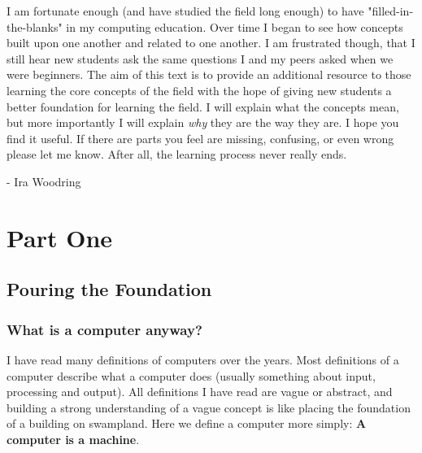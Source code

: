 \documentclass[11pt,fleqn]{book} %
\begin{document}
I am fortunate enough (and have studied the field long enough) to have "filled-in-the-blanks" in my computing education.  Over time I began to see how concepts built upon one another and related to one another.  I am frustrated though, that I still hear new students ask the same questions I and my peers asked when we were beginners.  The aim of this text is to provide an additional resource to those learning the core concepts of the field with the hope of giving new students a better foundation for learning the field.  I will explain what the concepts mean, but more importantly I will explain \textit{why} they are the way they are.  I hope you find it useful.  If there are parts you feel are missing, confusing, or even wrong please let me know.  After all, the learning process never really ends.

- Ira Woodring 



\part{Part One}



\chapter{Pouring the Foundation}

\begin{quote}

\end{quote}

\section{What is a computer anyway?}

I have read many definitions of computers over the years.  Most definitions of a computer describe what a computer  does (usually something about input, processing and output).  All definitions I have read are vague or abstract, and building a strong understanding of a vague concept is like placing the foundation of a building on swampland.  Here we define a computer  more simply:  \textbf{A computer is a machine}.
\end{document}
